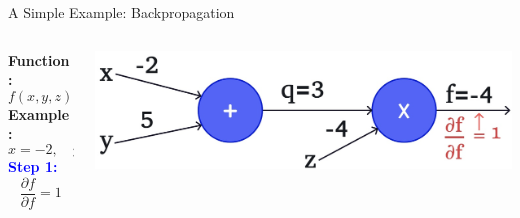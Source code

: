 \documentclass[serif, aspectratio=169]{beamer}
\begin{document}
\begin{frame}{A Simple Example: Backpropagation}

    \begin{columns}
       
        \begin{column}{0.3\textwidth}
            \vspace{-0.4cm} %
            \textbf{Function:} 
            \[
            f(x, y, z) = (x + y)z
            \]
            \textbf{Example:} 
            \[
            x = -2, \quad y = 5, \quad z = -4
            \]
            \textcolor{blue}{\textbf{Step 1:}}
            \[
            \frac{\partial f}{\partial f} = 1
            \]
        \end{column}

        \begin{column}{0.7\textwidth}
                    \begin{center}
                \includegraphics[width=\textwidth, keepaspectratio]{pic/b3.jpg}
            \end{center}
        \end{column}

    \end{columns}

\end{frame}
\end{document}
